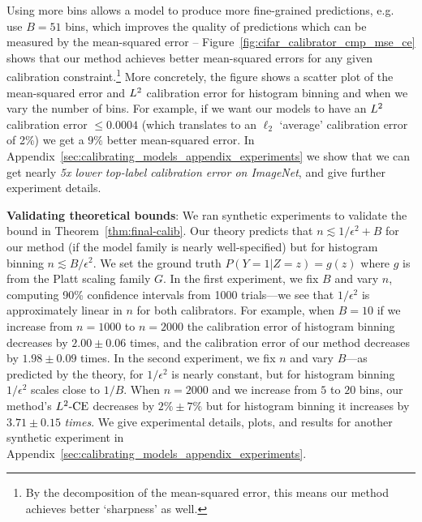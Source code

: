 Using more bins allows a model to produce more fine-grained predictions, e.g.~\cite{brocker2012empirical} use $B = 51$ bins, which improves the quality of predictions which can be measured by the mean-squared error -- Figure~\ref{fig:cifar_calibrator_cmp_mse_ce} shows that our method achieves better mean-squared errors for any given calibration constraint.\footnote{By the decomposition of the mean-squared error, this means our method achieves better `sharpness' as well.} More concretely, the figure shows a scatter plot of the mean-squared error and $L^2{}$ calibration error for histogram binning and \ourcal{} when we vary the number of bins. For example, if we want our models to have an $L^2{}$ calibration error $\leq 0.0004$ (which translates to an $\ell_2$ `average' calibration error of 2\%) we get a $9\%$ better mean-squared error. In Appendix~\ref{sec:calibrating_models_appendix_experiments} we show that we can get nearly \emph{5x lower top-label calibration error on ImageNet}, and give further experiment details.

\textbf{Validating theoretical bounds}: We ran synthetic experiments to validate the bound in Theorem~\ref{thm:final-calib}. Our theory predicts that $n \lesssim 1/\epsilon^2 + B$ for our method (if the model family is nearly well-specified) but for histogram binning $n \lesssim B/\epsilon^2$. We set the ground truth $P(Y = 1 | Z=z) = g(z)$ where $g$ is from the Platt scaling family $G$. In the first experiment, we fix $B$ and vary $n$, computing 90\% confidence intervals from 1000 trials---we see that $1/\epsilon^2$ is approximately linear in $n$ for both calibrators. For example, when $B=10$ if we increase from $n=1000$ to $n=2000$ the calibration error of histogram binning decreases by $2.00 \pm 0.06$ times, and the calibration error of our method decreases by $1.98 \pm 0.09$ times. In the second experiment, we fix $n$ and vary $B$---as predicted by the theory, for \ourcal{} $1/\epsilon^2$ is nearly constant, but for histogram binning $1/\epsilon^2$ scales close to $1/B$. When $n = 2000$ and we increase from $5$ to $20$ bins, our method's $L^2\mbox{-CE}$ decreases by $2\% \pm 7\%$ but for histogram binning it increases by $3.71 \pm 0.15$ \emph{times}. We give experimental details, plots, and results for another synthetic experiment in Appendix~\ref{sec:calibrating_models_appendix_experiments}.

